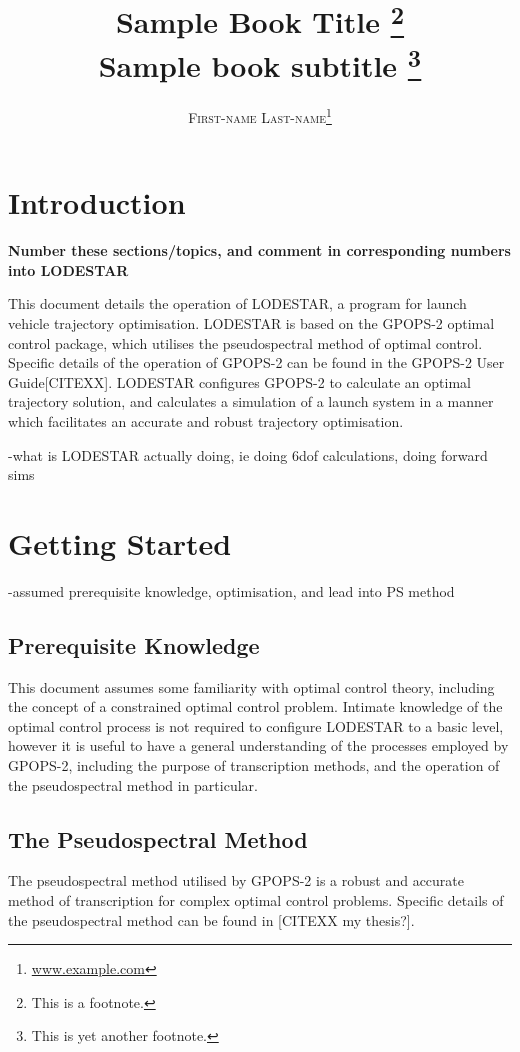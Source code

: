 \documentclass[a4paper,11pt]{book}
\title{\Huge \textbf{Sample Book Title}  \footnote{This is a footnote.} \\ \huge Sample book subtitle \footnote{This is yet another footnote.}}
\author{\textsc{First-name Last-name}\thanks{\url{www.example.com}}}
\begin{document}
\frontmatter
\maketitle


\tableofcontents


\mainmatter


\chapter{Introduction}

\textbf{Number these sections/topics, and comment in corresponding numbers into LODESTAR}

This document details the operation of LODESTAR, a program for launch vehicle trajectory optimisation. LODESTAR is based on the GPOPS-2 optimal control package, which utilises the pseudospectral method of optimal control. Specific details of the operation of GPOPS-2 can be found in the GPOPS-2 User Guide[CITEXX]. LODESTAR configures GPOPS-2 to calculate an optimal trajectory solution, and calculates a simulation of a launch system in a manner which facilitates an accurate and robust trajectory optimisation.

-what is LODESTAR actually doing, ie doing 6dof calculations, doing forward sims

\chapter{Getting Started}
-assumed prerequisite knowledge, optimisation, and lead into PS method

\section{Prerequisite Knowledge}
This document assumes some familiarity with optimal control theory, including the concept of a constrained optimal control problem. Intimate knowledge of the optimal control process is not required to configure LODESTAR to a basic level, however it is useful to have a general understanding of the processes employed by GPOPS-2, including the purpose of transcription methods, and the operation of the pseudospectral method in particular.

\section{The Pseudospectral Method}
The pseudospectral method utilised by GPOPS-2 is a robust and accurate method of transcription for complex optimal control problems. Specific details of the pseudospectral method can be found in [CITEXX my thesis?].
\end{document}

